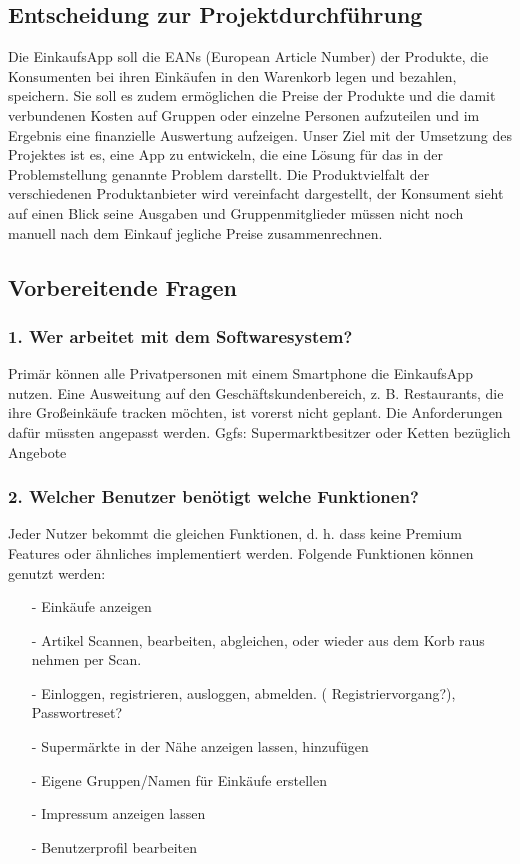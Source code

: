 \documentclass[12pt,a4paper]{article}
\begin{document}
\subsection{Entscheidung zur Projektdurchführung}
Die EinkaufsApp soll die EANs (European Article Number) der Produkte, die Konsumenten bei ihren Einkäufen in den Warenkorb legen und bezahlen, speichern.
Sie soll es zudem ermöglichen die Preise der Produkte und die damit verbundenen Kosten auf Gruppen oder einzelne Personen aufzuteilen und im Ergebnis eine finanzielle Auswertung aufzeigen.
Unser Ziel mit der Umsetzung des Projektes ist es, eine App zu entwickeln, die eine Lösung für das in der Problemstellung genannte Problem darstellt. 
Die Produktvielfalt der verschiedenen Produktanbieter wird vereinfacht dargestellt, der Konsument sieht auf einen Blick seine Ausgaben und Gruppenmitglieder müssen nicht noch manuell nach dem Einkauf jegliche Preise zusammenrechnen.

\newpage
\subsection{Vorbereitende Fragen}
\subsubsection*{1. Wer arbeitet mit dem Softwaresystem?}
Primär können alle Privatpersonen mit einem Smartphone die EinkaufsApp nutzen. Eine Ausweitung auf den Geschäftskundenbereich, z. B. Restaurants, die ihre Großeinkäufe tracken möchten, ist vorerst nicht geplant. Die Anforderungen dafür müssten angepasst werden. 
Ggfs: Supermarktbesitzer oder Ketten bezüglich Angebote
 
\subsubsection*{2. Welcher Benutzer benötigt welche Funktionen?}
Jeder Nutzer bekommt die gleichen Funktionen, d. h. dass keine Premium Features oder ähnliches implementiert werden.
Folgende Funktionen können genutzt werden:
\begin{itemize}
\item[-]Einkäufe anzeigen
\item[-]Artikel Scannen, bearbeiten, abgleichen,  oder wieder aus dem Korb raus nehmen per Scan.
\item[-]Einloggen, registrieren, ausloggen, abmelden.  ( Registriervorgang?), Passwortreset?
\item[-]Supermärkte in der Nähe anzeigen lassen, hinzufügen 
\item[-]Eigene Gruppen/Namen für Einkäufe erstellen
\item[-]Impressum anzeigen lassen 
\item[-]Benutzerprofil bearbeiten         
\end{itemize} 
\end{document}

